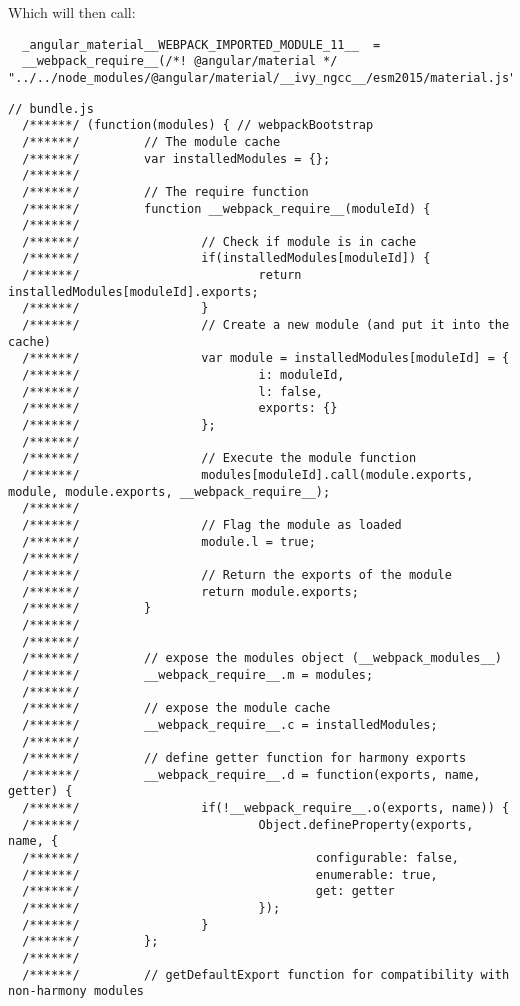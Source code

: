 Which will then call: 
\begin{lstlisting}
  _angular_material__WEBPACK_IMPORTED_MODULE_11__  = 
  __webpack_require__(/*! @angular/material */ "../../node_modules/@angular/material/__ivy_ngcc__/esm2015/material.js");
\end{lstlisting}

\begin{lstlisting}[caption=webpack require source code]
  // bundle.js
  /******/ (function(modules) { // webpackBootstrap
  /******/         // The module cache
  /******/         var installedModules = {};
  /******/
  /******/         // The require function
  /******/         function __webpack_require__(moduleId) {
  /******/
  /******/                 // Check if module is in cache
  /******/                 if(installedModules[moduleId]) {
  /******/                         return installedModules[moduleId].exports;
  /******/                 }
  /******/                 // Create a new module (and put it into the cache)
  /******/                 var module = installedModules[moduleId] = {
  /******/                         i: moduleId,
  /******/                         l: false,
  /******/                         exports: {}
  /******/                 };
  /******/
  /******/                 // Execute the module function
  /******/                 modules[moduleId].call(module.exports, module, module.exports, __webpack_require__);
  /******/
  /******/                 // Flag the module as loaded
  /******/                 module.l = true;
  /******/
  /******/                 // Return the exports of the module
  /******/                 return module.exports;
  /******/         }
  /******/
  /******/
  /******/         // expose the modules object (__webpack_modules__)
  /******/         __webpack_require__.m = modules;
  /******/
  /******/         // expose the module cache
  /******/         __webpack_require__.c = installedModules;
  /******/
  /******/         // define getter function for harmony exports
  /******/         __webpack_require__.d = function(exports, name, getter) {
  /******/                 if(!__webpack_require__.o(exports, name)) {
  /******/                         Object.defineProperty(exports, name, {
  /******/                                 configurable: false,
  /******/                                 enumerable: true,
  /******/                                 get: getter
  /******/                         });
  /******/                 }
  /******/         };
  /******/
  /******/         // getDefaultExport function for compatibility with non-harmony modules

\end{lstlisting}
